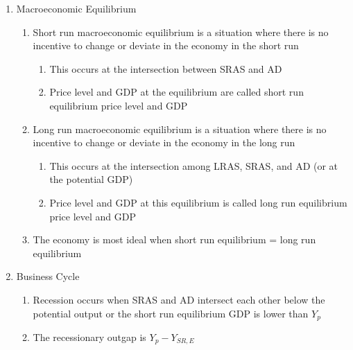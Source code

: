\documentclass[12pt]{article}
\begin{document}
\begin{enumerate}
      \item Macroeconomic Equilibrium

        \begin{enumerate}

          \item Short run macroeconomic equilibrium is a situation where there is no incentive to change or deviate in the economy in the short run

            \begin{enumerate}

              \item This occurs at the intersection between SRAS and AD

              \item Price level and GDP at the equilibrium are called short run equilibrium price level and GDP

            \end{enumerate}

          \item Long run macroeconomic equilibrium is a situation where there is no incentive to change or deviate in the economy in the long run

            \begin{enumerate}

              \item This occurs at the intersection among LRAS, SRAS, and AD (or at the potential GDP)

              \item Price level and GDP at this equilibrium is called long run equilibrium price level and GDP

            \end{enumerate}

          \item The economy is most ideal when short run equilibrium = long run equilibrium

        \end{enumerate}

      \item Business Cycle

        \begin{enumerate}

          \item Recession occurs when SRAS and AD intersect each other below the potential output or the short run equilibrium GDP is lower than $Y_p$

          \item The recessionary outgap is $Y_p-Y_{SR,E}$


\end{enumerate}
\end{enumerate}
\end{document}
